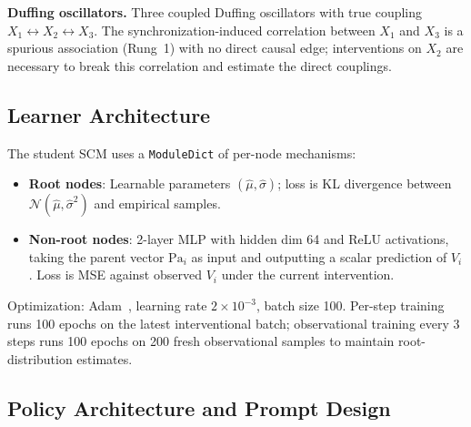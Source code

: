 \textbf{Duffing oscillators.} Three coupled Duffing oscillators with true coupling $X_1 \leftrightarrow X_2 \leftrightarrow X_3$. The synchronization-induced correlation between $X_1$ and $X_3$ is a spurious association (Rung~1) with no direct causal edge; interventions on $X_2$ are necessary to break this correlation and estimate the direct couplings.

\subsection{Learner Architecture}
\label{app:learner}

The student SCM uses a \texttt{ModuleDict} of per-node mechanisms:
\begin{itemize}[leftmargin=1.2em,topsep=0.2em,itemsep=0.1em]
\item \textbf{Root nodes}: Learnable parameters $(\hat{\mu}, \hat{\sigma})$; loss is KL divergence between $\mathcal{N}(\hat{\mu}, \hat{\sigma}^2)$ and empirical samples.
\item \textbf{Non-root nodes}: 2-layer MLP with hidden dim 64 and ReLU activations, taking the parent vector $\text{Pa}_i$ as input and outputting a scalar prediction of $V_i$. Loss is MSE against observed $V_i$ under the current intervention.
\end{itemize}
Optimization: Adam~\citep{kingma2015adam}, learning rate $2 \times 10^{-3}$, batch size 100. Per-step training runs 100 epochs on the latest interventional batch; observational training every 3 steps runs 100 epochs on 200 fresh observational samples to maintain root-distribution estimates.

\subsection{Policy Architecture and Prompt Design}
\label{app:policy}

